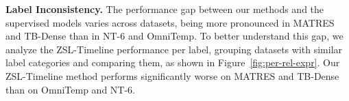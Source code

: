 

\textbf{Label Inconsistency.}
The performance gap between our methods and the supervised models varies across datasets, being more pronounced in MATRES and TB-Dense than in NT-6 and OmniTemp. To better understand this gap, we analyze the ZSL-Timeline performance per label, grouping datasets with similar label categories and comparing them, as shown in Figure~\ref{fig:per-rel-expr}. Our ZSL-Timeline method performs significantly worse on MATRES and TB-Dense than on OmniTemp and NT-6.

